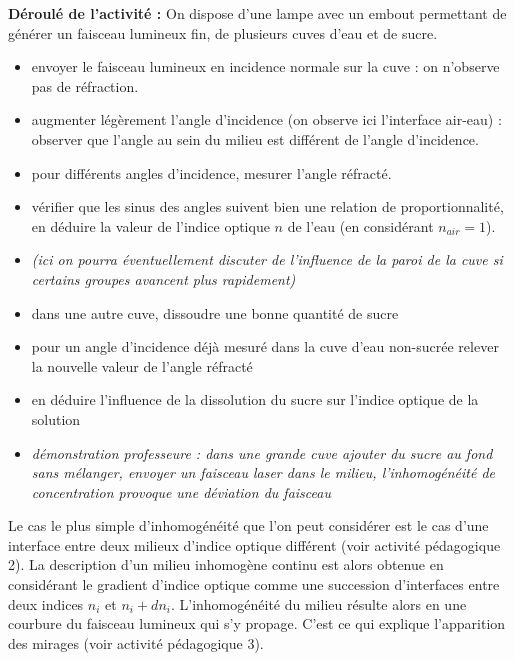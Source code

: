 \documentclass[a4paper,11pt]{article} %
\newcommand{\pointmedian}{\fontfamily{cmr}\selectfont\textperiodcentered}
\newenvironment{encart}[1]{%
	\begin{tcolorbox}
		[
		breakable, enhanced jigsaw, %
		arc = 1mm, %
		title = \textbf{#1}, %
		coltitle = white, %
		colbacktitle = blue, %
		colback = white, %
		colframe = blue %
		]
}{		
	\end{tcolorbox}
}
\begin{document}
\begin{encart}{Activité pédagogique 2 : réfraction à une interface -- Loi de Snell-Descartes}
		\textbf{Déroulé de l'activité :}
		On dispose d'une lampe avec un embout permettant de générer un faisceau lumineux fin, de plusieurs cuves d'eau et de sucre.
		\begin{itemize}
			\item envoyer le faisceau lumineux en incidence normale sur la cuve : on n'observe pas de réfraction.
			\item augmenter légèrement l'angle d'incidence (on observe ici l'interface air-eau) : observer que l'angle au sein du milieu est différent de l'angle d'incidence.
			\item pour différents angles d'incidence, mesurer l'angle réfracté.
			\item vérifier que les sinus des angles suivent bien une relation de proportionnalité, en déduire la valeur de l'indice optique $ n $ de l'eau (en considérant $ n_{air} = 1 $).
			\item \textit{(ici on pourra éventuellement discuter de l'influence de la paroi de la cuve si certains groupes avancent plus rapidement)}
			\item dans une autre cuve, dissoudre une bonne quantité de sucre
			\item pour un angle d'incidence déjà mesuré dans la cuve d'eau non-sucrée relever la nouvelle valeur de l'angle réfracté
			\item en déduire l'influence de la dissolution du sucre sur l'indice optique de la solution
			\item \textit{démonstration professeur\pointmedian e : dans une grande cuve ajouter du sucre au fond sans mélanger, envoyer un faisceau laser dans le milieu, l'inhomogénéité de concentration provoque une déviation du faisceau} 
		\end{itemize}
		
	\end{encart}

	Le cas le plus simple d'inhomogénéité que l'on peut considérer est le cas d'une interface entre deux milieux d'indice optique différent (voir activité pédagogique 2). La description d'un milieu inhomogène continu est alors obtenue en considérant le gradient d'indice optique comme une succession d'interfaces entre deux indices $ n_i $ et $ n_i + dn_i $. L'inhomogénéité du milieu résulte alors en une courbure du faisceau lumineux qui s'y propage. C'est ce qui explique l'apparition des mirages (voir activité pédagogique 3).\\
	
\end{document}
